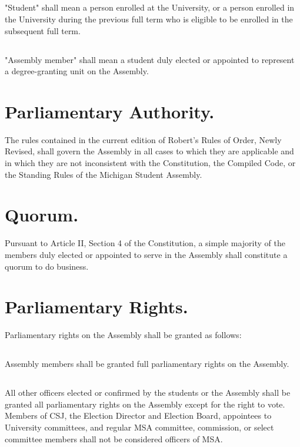 \documentclass{rules}
\begin{document}
\subsection{}
"Student" shall mean a person enrolled at the University, or a person enrolled in the University during the previous full term who is eligible to be enrolled in the subsequent full term.
\subsection{}
"Assembly member" shall mean a student duly elected or appointed to represent a degree-granting unit on the Assembly.

\section{Parliamentary Authority.}
The rules contained in the current edition of Robert's Rules of Order, Newly Revised, shall govern the Assembly in all cases to which they are applicable and in which they are not inconsistent with the Constitution, the Compiled Code, or the Standing Rules of the Michigan Student Assembly.

\section{Quorum.}
Pursuant to Article II, Section 4 of the Constitution, a simple majority of the members duly elected or appointed to serve in the Assembly shall constitute a quorum to do business.

\section{Parliamentary Rights.}
Parliamentary rights on the Assembly shall be granted as follows:
\subsection{}
Assembly members shall be granted full parliamentary rights on the Assembly.
\subsection{}
All other officers elected or confirmed by the students or the Assembly shall be granted all parliamentary rights on the Assembly except for the right to vote.  Members of CSJ, the Election Director and Election Board, appointees to University committees, and regular MSA committee, commission, or select committee members shall not be considered officers of MSA.
\end{document}
